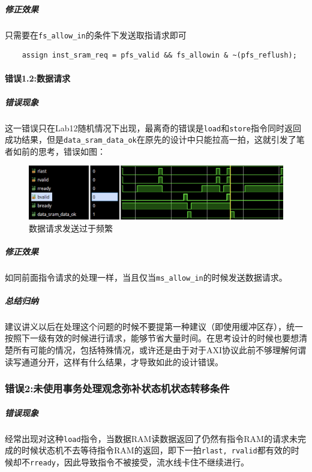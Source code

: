 \documentclass[UTF-8,twoside,c5size]{ctexart}
\begin{document}
	\subparagraph{修正效果}\hfill
	
	只需要在\texttt{fs_allow_in}的条件下发送取指请求即可
	
    \begin{verbatim}
    assign inst_sram_req = pfs_valid && fs_allowin & ~(pfs_reflush);
    \end{verbatim}
	
	\paragraph{错误\textbf{1.2:}数据请求}\hfill
	
	\subparagraph{错误现象}\hfill
	
	这一错误只在Lab12随机情况下出现，最离奇的错误是\texttt{load}和\texttt{store}指令同时返回成功结果，但是\texttt{data_sram_data_ok}在原先的设计中只能拉高一拍，这就引发了笔者如前的思考，错误如图：
	
	\begin{figure}[h]
		\centering
		\includegraphics[width=0.8\linewidth]{data_req_frequently.png}
		\caption[data_req_frequently]{数据请求发送过于频繁}
		\label{fig:data_req_frequently}
	\end{figure}

	\subparagraph{修正效果}\hfill
	
	如同前面指令请求的处理一样，当且仅当\texttt{ms_allow_in}的时候发送数据请求。
	
	\subparagraph{总结归纳}\hfill
	
	建议讲义以后在处理这个问题的时候不要提第一种建议（即使用缓冲区存），统一按照下一级有效的时候进行请求，能够节省大量时间。在思考设计的时候也要想清楚所有可能的情况，包括特殊情况，或许还是由于对于AXI协议此前不够理解何谓读写通道分开，这样有什么结果，才导致如此的设计错误。
	
	\subsubsection{错误\textbf{2:}未使用事务处理观念弥补状态机状态转移条件}
	\label{business}
	
	\subparagraph{错误现象}\hfill
	
	经常出现对这种\texttt{load}指令，当数据RAM读数据返回了仍然有指令RAM的请求未完成的时候状态机不去等待指令RAM的返回，即下一拍\texttt{rlast, rvalid}都有效的时候却不\texttt{rready}，因此导致指令不被接受，流水线卡住不继续进行。
	
\end{document}
